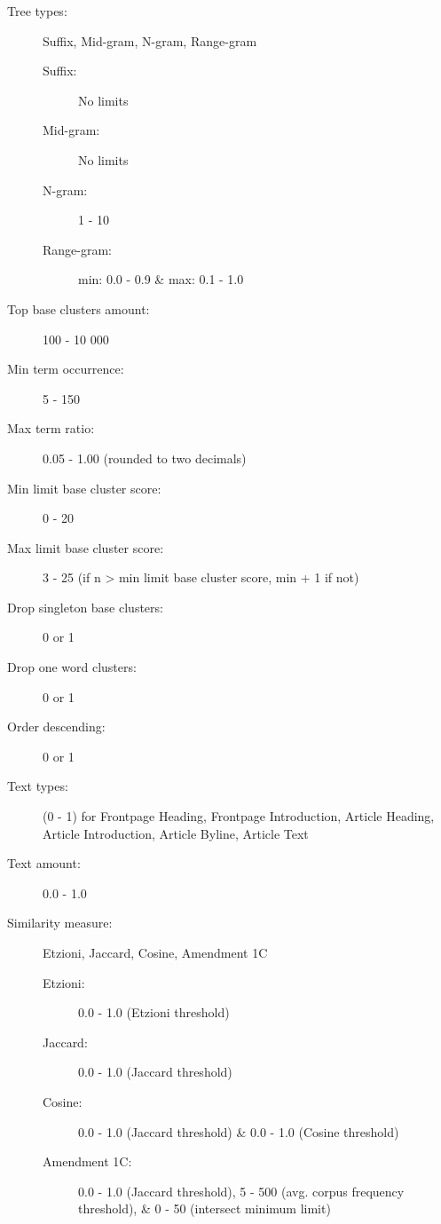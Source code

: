 \begin{description}
  \item[Tree types:] Suffix, Mid-gram, N-gram, Range-gram\hfill
  	\begin{description}
	  \item[Suffix:] No limits
	  \item[Mid-gram:] No limits
	  \item[N-gram:] 1 - 10
	  \item[Range-gram:] min: 0.0 - 0.9 \& max: 0.1 - 1.0
	\end{description}
  \item[Top base clusters amount:] 100 - 10 000
  \item[Min term occurrence:] 5 - 150
  \item[Max term ratio:] 0.05 - 1.00 (rounded to two decimals)
  \item[Min limit base cluster score:] 0 - 20
  \item[Max limit base cluster score:] 3 - 25 (if n > min limit base cluster score, min + 1 if not)
  \item[Drop singleton base clusters:] 0 or 1
  \item[Drop one word clusters:] 0 or 1
  \item[Order descending:] 0 or 1
  \item[Text types:] (0 - 1) for Frontpage Heading, Frontpage Introduction, Article Heading, Article Introduction, Article Byline, Article Text
  \item[Text amount:] 0.0 - 1.0
  \item[Similarity measure:] Etzioni, Jaccard, Cosine, Amendment 1C\hfill
  	\begin{description}
	  \item[Etzioni:] 0.0 - 1.0 (Etzioni threshold)
	  \item[Jaccard:] 0.0 - 1.0 (Jaccard threshold)
	  \item[Cosine:] 0.0 - 1.0 (Jaccard threshold) \& 0.0 - 1.0 (Cosine threshold)
	  \item[Amendment 1C:] 0.0 - 1.0 (Jaccard threshold), 5 - 500 (avg. corpus frequency threshold), \& 0 - 50 (intersect minimum limit) 
	\end{description}
\end{description}

